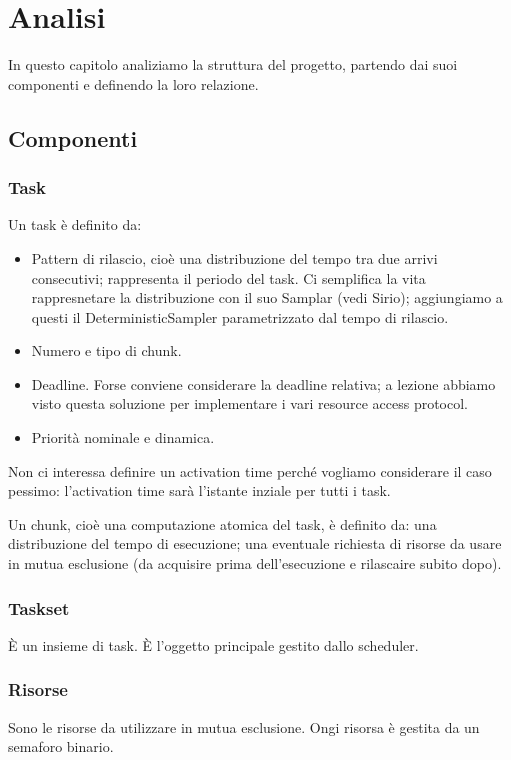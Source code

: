 \chapter{Analisi}
In questo capitolo analiziamo la struttura del progetto, partendo dai suoi componenti e definendo la loro relazione.

\section{Componenti}

\subsection{Task}
Un task è definito da:
\begin{itemize}
    \item Pattern di rilascio, cioè una distribuzione del tempo tra due arrivi consecutivi; rappresenta il periodo del task. Ci semplifica la vita rappresnetare la distribuzione con il suo Samplar (vedi Sirio); aggiungiamo a questi il DeterministicSampler parametrizzato dal tempo di rilascio.
    \item Numero e tipo di chunk.
    \item Deadline. Forse conviene considerare la deadline relativa; a lezione abbiamo visto questa soluzione per implementare i vari resource access protocol.
    \item Priorità nominale e dinamica.
\end{itemize}

Non ci interessa definire un activation time perché vogliamo considerare il caso pessimo: l'activation time sarà l'istante inziale per tutti i task.

\myskip

Un chunk, cioè una computazione atomica del task, è definito da: una distribuzione del tempo di esecuzione; una eventuale richiesta di risorse da usare in mutua esclusione (da acquisire prima dell'esecuzione e rilascaire subito dopo).

\subsection{Taskset}
È un insieme di task. È l'oggetto principale gestito dallo scheduler.

\subsection{Risorse}
Sono le risorse da utilizzare in mutua esclusione. Ongi risorsa è gestita da un semaforo binario.

